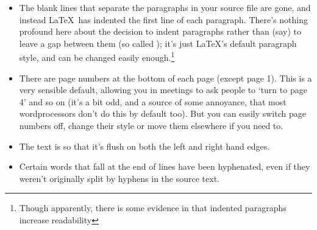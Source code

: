 \begin{refsection}

\begin{itemize}
\item The blank lines that separate the paragraphs in your source file are gone, and instead \LaTeX\ has indented the first line of each paragraph. There's nothing profound here about the decision to indent paragraphs rather than (say) to leave a gap between them (so called ); it's just \LaTeX's default paragraph style, and can be changed easily enough.\footnote{Though apparently, there is some evidence in \cite{tinker63} that indented paragraphs increase readability}
\item There are page numbers at the bottom of each page (except page 1). This is a very sensible default, allowing you in meetings to ask people to `turn to page 4' and so on (it's a bit odd, and a source of some annoyance, that most wordprocessors don't do this by default too). But you can easily switch page numbers off, change their style or move them elsewhere if you need to. 
\item The text is  so that it's flush on both the left and right hand edges.
\item Certain words that fall at the end of lines have been hyphenated, even if they weren't originally split by hyphens in the source text.
\end{itemize}


\end{refsection}
